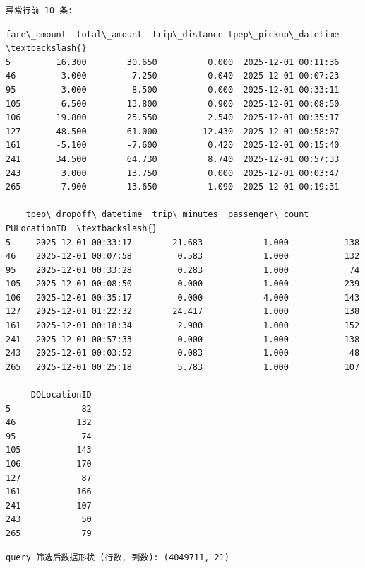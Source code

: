 \documentclass[11pt]{article}
\begin{document}
    \begin{Verbatim}[commandchars=\\\{\}]
异常行前 10 条:

    \end{Verbatim}

    
    \begin{Verbatim}[commandchars=\\\{\}]
     fare\_amount  total\_amount  trip\_distance tpep\_pickup\_datetime  \textbackslash{}
5         16.300        30.650          0.000  2025-12-01 00:11:36   
46        -3.000        -7.250          0.040  2025-12-01 00:07:23   
95         3.000         8.500          0.000  2025-12-01 00:33:11   
105        6.500        13.800          0.900  2025-12-01 00:08:50   
106       19.800        25.550          2.540  2025-12-01 00:35:17   
127      -48.500       -61.000         12.430  2025-12-01 00:58:07   
161       -5.100        -7.600          0.420  2025-12-01 00:15:40   
241       34.500        64.730          8.740  2025-12-01 00:57:33   
243        3.000        13.750          0.000  2025-12-01 00:03:47   
265       -7.900       -13.650          1.090  2025-12-01 00:19:31   

    tpep\_dropoff\_datetime  trip\_minutes  passenger\_count  PULocationID  \textbackslash{}
5     2025-12-01 00:33:17        21.683            1.000           138   
46    2025-12-01 00:07:58         0.583            1.000           132   
95    2025-12-01 00:33:28         0.283            1.000            74   
105   2025-12-01 00:08:50         0.000            1.000           239   
106   2025-12-01 00:35:17         0.000            4.000           143   
127   2025-12-01 01:22:32        24.417            1.000           138   
161   2025-12-01 00:18:34         2.900            1.000           152   
241   2025-12-01 00:57:33         0.000            1.000           138   
243   2025-12-01 00:03:52         0.083            1.000            48   
265   2025-12-01 00:25:18         5.783            1.000           107   

     DOLocationID  
5              82  
46            132  
95             74  
105           143  
106           170  
127            87  
161           166  
241           107  
243            50  
265            79  
    \end{Verbatim}

    
    \begin{Verbatim}[commandchars=\\\{\}]
query 筛选后数据形状 (行数, 列数): (4049711, 21)
    \end{Verbatim}
\end{document}
